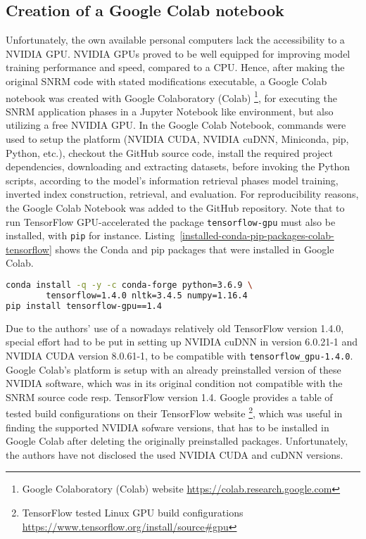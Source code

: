\subsection{Creation of a Google Colab notebook}
Unfortunately, the own available personal computers lack the accessibility to a NVIDIA GPU.
NVIDIA GPUs proved to be well equipped for improving model training performance and speed, compared to a CPU.
Hence, after making the original SNRM code with stated modifications executable, a Google Colab notebook was created
    with Google Colaboratory (Colab) 
    \footnote{Google Colaboratory (Colab) website \url{https://colab.research.google.com}},
    for executing the SNRM application phases in a Jupyter Notebook like environment, 
    but also utilizing a free NVIDIA GPU.
In the Google Colab Notebook, commands were used to setup the platform (NVIDIA CUDA, NVIDIA cuDNN, Miniconda, pip, Python, etc.),
    checkout the GitHub source code,
    install the required project dependencies, downloading and extracting datasets,
    before invoking the Python scripts, according to the model's information retrieval phases
    model training, inverted index construction, retrieval, and evaluation.
For reproducibility reasons, the Google Colab Notebook was added to the GitHub repository.
Note that to run TensorFlow GPU-accelerated the package \verb|tensorflow-gpu| must also be installed,
    with \verb|pip| for instance.
Listing~\ref{installed-conda-pip-packages-colab-tensorflow} shows the Conda and pip packages that were installed in Google Colab.

\begin{lstlisting}[language=bash,frame=single,breaklines=true,float=tbh,caption=Installed Conda and pip packages in Google Colab Notebook for SNRM TensorFlow implementation,label=installed-conda-pip-packages-colab-tensorflow]
conda install -q -y -c conda-forge python=3.6.9 \
        tensorflow=1.4.0 nltk=3.4.5 numpy=1.16.4
pip install tensorflow-gpu==1.4
\end{lstlisting}

Due to the authors' use of a nowadays relatively old TensorFlow version 1.4.0, special effort had to be put in setting up
    NVIDIA cuDNN in version 6.0.21-1 and NVIDIA CUDA version 8.0.61-1, to be compatible with \verb|tensorflow_gpu-1.4.0|.
Google Colab's platform is setup with an already preinstalled version of these NVIDIA software, which was in its original condition
    not compatible with the SNRM source code resp. TensorFlow version 1.4.
Google provides a table of tested build configurations on their TensorFlow website
    \footnote{TensorFlow tested Linux GPU build configurations \url{https://www.tensorflow.org/install/source\#gpu}}, 
    which was useful in finding the supported NVIDIA sofware versions, that has to be installed in Google Colab 
    after deleting the originally preinstalled packages.
Unfortunately, the authors have not disclosed the used NVIDIA CUDA and cuDNN versions.

